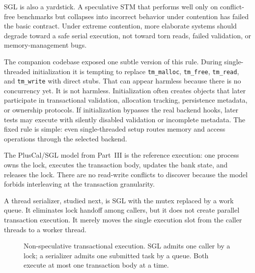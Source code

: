 SGL is also a yardstick. A speculative STM that performs well only on conflict-free benchmarks but collapses into incorrect behavior under contention has failed the basic contract. Under extreme contention, more elaborate systems should degrade toward a safe serial execution, not toward torn reads, failed validation, or memory-management bugs.

The companion codebase exposed one subtle version of this rule. During single-threaded initialization it is tempting to replace \texttt{tm\_malloc}, \texttt{tm\_free}, \texttt{tm\_read}, and \texttt{tm\_write} with direct stubs. That can appear harmless because there is no concurrency yet. It is not harmless. Initialization often creates objects that later participate in transactional validation, allocation tracking, persistence metadata, or ownership protocols. If initialization bypasses the real backend hooks, later tests may execute with silently disabled validation or incomplete metadata. The fixed rule is simple: even single-threaded setup routes memory and access operations through the selected backend.

The PlusCal/SGL model from Part~III is the reference execution: one process owns the lock, executes the transaction body, updates the bank state, and releases the lock. There are no read-write conflicts to discover because the model forbids interleaving at the transaction granularity.

A thread serializer, studied next, is SGL with the mutex replaced by a work queue. It eliminates lock handoff among callers, but it does not create parallel transaction execution. It merely moves the single execution slot from the caller threads to a worker thread.

\begin{figure}[htbp]
\centering
{}
\caption{Non-speculative transactional execution. SGL admits one caller by a lock; a serializer admits one submitted task by a queue. Both execute at most one transaction body at a time.}
\label{fig:nonspec-state-machine}
\end{figure}

